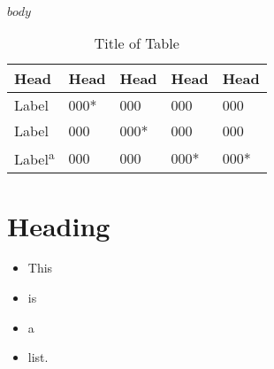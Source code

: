 \documentclass[10pt, letterpaper]{article}
\begin{document}
$body$
\begin{table}[h]

\begin{tabular}{lllll} %
\toprule
Head & Head & Head & Head & Head \\
\midrule
Label & 000* & 000 & 000 & 000 \\
Label & 000 & 000* & 000 & 000 \\
Label\textsuperscript{a} & 000 & 000 & 000* & 000*\\
\bottomrule
\end{tabular}
\caption{Title of Table} %
\end{table}





\section{Heading}


\begin{itemize}
\item This
\item is
\item a
\item list.
\end{itemize}
\end{document}
